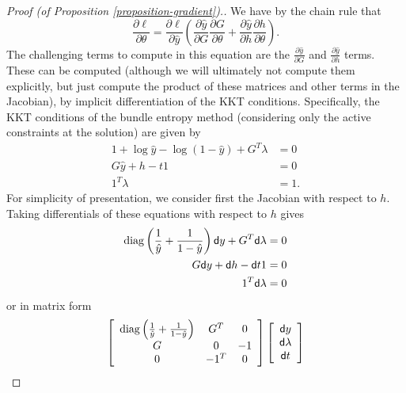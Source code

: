 \begin{proof}[Proof (of Proposition \ref{proposition-gradient}).]
We have by the chain rule that
\begin{equation}
\frac{\partial \ell }{\partial \theta} =
\frac{\partial \ell}{\partial \hat{y}} \left
( \frac{\partial \hat{y}}{\partial G} \frac{\partial G}{\partial \theta} +
\frac{\partial \hat{y}}{\partial h} \frac{\partial h}{\partial \theta}
\right).
\end{equation}
The challenging terms to compute in this equation are the $\frac{\partial \hat
{y}}
{\partial G}$ and $\frac{\partial \hat{y}}{\partial h}$ terms.  These can be
computed (although we will ultimately not compute them explicitly, but just
compute the product of these matrices and other terms in the Jacobian), by
implicit differentiation of the KKT conditions.  Specifically, the
KKT conditions of the bundle entropy method (considering only the active
constraints at the solution) are given by
\begin{equation}
\begin{split}
1 + \log \hat{y} - \log (1-\hat{y}) + G^T \lambda & = 0 \\
G\hat{y} + h - t1 & = 0 \\
1^T \lambda & = 1.
\end{split}
\end{equation}
For simplicity of presentation, we consider first the Jacobian with respect to
$h$.  Taking differentials of these equations with respect to $h$ gives
\begin{equation}
\begin{split}
\operatorname*{diag}\left(\frac{1}{\hat{y}} + \frac{1}{1-\hat{y}}\right) \mathsf{d} y + G^T \mathsf{d}
\lambda & = 0 \\
G \mathsf{d} y + \mathsf{d} h - \mathsf{d} t 1 & = 0 \\
1^T \mathsf{d} \lambda & = 0
\end{split}
\end{equation}
or in matrix form
\begin{equation}
\left [ \begin{array}{ccc}
\diag\left(\frac{1}{\hat{y}} + \frac{1}{1-\hat{y}}\right) & G^T & 0 \\
G & 0 & -1 \\
0 & -1^T & 0 \end{array} \right ]
\left [ \begin{array}{c} \dd y \\ \dd \lambda \\ \dd t \end{array} \right ]

\end{equation}
\end{proof}

